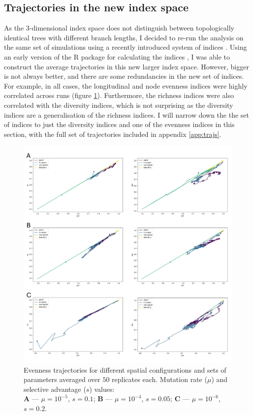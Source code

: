 \subsection{Trajectories in the new index space}
As the $3$-dimensional index space does not distinguish between topologically
identical trees with different branch lengths, I decided to re-run the analysis
on the same set of simulations using a recently introduced system of indices
\cite{noble_new_2023}. Using an early version of the R package for calculating
the indices \cite{kimverity_kimverityruiindices_2023}, I was able to construct
the average trajectories in this new larger index space. However, bigger is not
always better, and there are some redundancies in the new set of indices. For
example, in all cases, the longitudinal and node evenness indices were highly
correlated across runs (figure \ref{fig:evenness_redundant}). Furthermore, the
richness indices were also correlated with the diversity indices, which is not
surprising as the diversity indices are a generalisation of the richness
indices. I will narrow down the the set of indices to just the diversity
indices and one of the evenness indices in this section, with the full set of
trajectories included in appendix \ref{app:trajs}.\par

\begin{figure}[h!]
    \centering
    \includegraphics[width=\textwidth]{Chapter_3/figures/redundancy.pdf}
    \caption{Evenness trajectories for different spatial configurations and
    sets of parameters averaged over $50$ replicates each. Mutation rate
    ($\mu$) and selective advantage ($s$) values:\\ \textbf{A} --- $\mu =
    10^{-5}$, $s = 0.1$; \textbf{B} --- $\mu = 10^{-4}$, $s = 0.05$; \textbf{C}
    --- $\mu = 10^{-6}$, $s = 0.2$.}
    \label{fig:evenness_redundant}
\end{figure}
\clearpage

